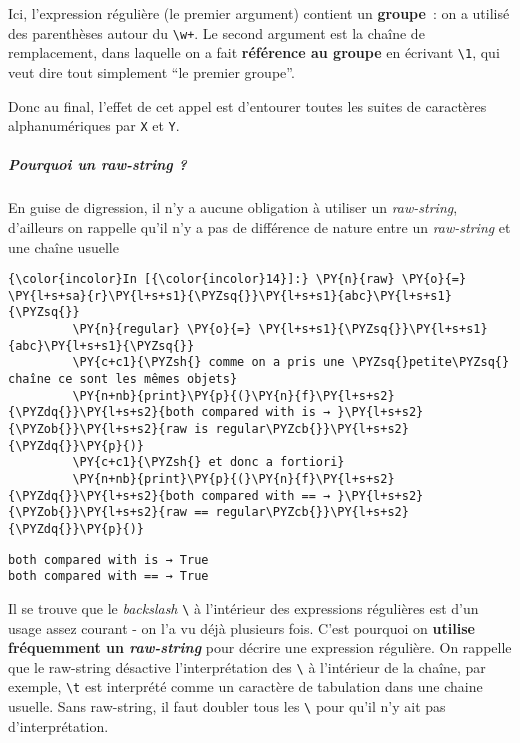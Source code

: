     Ici, l'expression régulière (le premier argument) contient un
\textbf{groupe}~: on a utilisé des parenthèses autour du
\texttt{\textbackslash{}w+}. Le second argument est la chaîne de
remplacement, dans laquelle on a fait \textbf{référence au groupe} en
écrivant \texttt{\textbackslash{}1}, qui veut dire tout simplement ``le
premier groupe''.

Donc au final, l'effet de cet appel est d'entourer toutes les suites de
caractères alphanumériques par \texttt{X} et \texttt{Y}.

    \hypertarget{pourquoi-un-raw-string}{%
\subparagraph{\texorpdfstring{Pourquoi un \emph{raw-string}
?}{Pourquoi un raw-string ?}}\label{pourquoi-un-raw-string}}

    En guise de digression, il n'y a aucune obligation à utiliser un
\emph{raw-string}, d'ailleurs on rappelle qu'il n'y a pas de différence
de nature entre un \emph{raw-string} et une chaîne usuelle

    \begin{Verbatim}[commandchars=\\\{\},frame=single,framerule=0.3mm,rulecolor=\color{cellframecolor}]
{\color{incolor}In [{\color{incolor}14}]:} \PY{n}{raw} \PY{o}{=} \PY{l+s+sa}{r}\PY{l+s+s1}{\PYZsq{}}\PY{l+s+s1}{abc}\PY{l+s+s1}{\PYZsq{}}
         \PY{n}{regular} \PY{o}{=} \PY{l+s+s1}{\PYZsq{}}\PY{l+s+s1}{abc}\PY{l+s+s1}{\PYZsq{}}
         \PY{c+c1}{\PYZsh{} comme on a pris une \PYZsq{}petite\PYZsq{} chaîne ce sont les mêmes objets}
         \PY{n+nb}{print}\PY{p}{(}\PY{n}{f}\PY{l+s+s2}{\PYZdq{}}\PY{l+s+s2}{both compared with is → }\PY{l+s+s2}{\PYZob{}}\PY{l+s+s2}{raw is regular\PYZcb{}}\PY{l+s+s2}{\PYZdq{}}\PY{p}{)}
         \PY{c+c1}{\PYZsh{} et donc a fortiori}
         \PY{n+nb}{print}\PY{p}{(}\PY{n}{f}\PY{l+s+s2}{\PYZdq{}}\PY{l+s+s2}{both compared with == → }\PY{l+s+s2}{\PYZob{}}\PY{l+s+s2}{raw == regular\PYZcb{}}\PY{l+s+s2}{\PYZdq{}}\PY{p}{)}
\end{Verbatim}


    \begin{Verbatim}[commandchars=\\\{\},frame=single,framerule=0.3mm,rulecolor=\color{cellframecolor}]
both compared with is → True
both compared with == → True
\end{Verbatim}

    Il se trouve que le \emph{backslash} \texttt{\textbackslash{}} à
l'intérieur des expressions régulières est d'un usage assez courant - on
l'a vu déjà plusieurs fois. C'est pourquoi on \textbf{utilise
fréquemment un \emph{raw-string}} pour décrire une expression régulière.
On rappelle que le raw-string désactive l'interprétation des
\texttt{\textbackslash{}} à l'intérieur de la chaîne, par exemple,
\texttt{\textbackslash{}t} est interprété comme un caractère de
tabulation dans une chaine usuelle. Sans raw-string, il faut doubler
tous les \texttt{\textbackslash{}} pour qu'il n'y ait pas
d'interprétation.

